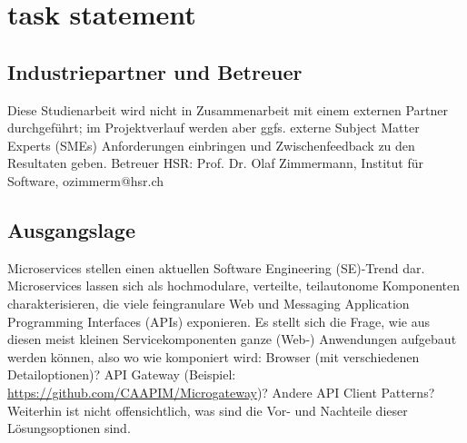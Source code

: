  
\section{task statement}

\subsection{Industriepartner und Betreuer}
Diese Studienarbeit wird nicht in Zusammenarbeit mit einem externen Partner durchgeführt; im Projektverlauf werden aber ggfs. externe Subject Matter Experts (SMEs) Anforderungen einbringen und Zwischenfeedback zu den Resultaten geben.   
Betreuer HSR: 
Prof. Dr. Olaf Zimmermann, Institut für Software, ozimmerm@hsr.ch  
\subsection{Ausgangslage}
Microservices stellen einen aktuellen Software Engineering (SE)-Trend dar. Microservices lassen sich als hochmodulare, verteilte, teilautonome Komponenten charakterisieren, die viele feingranulare Web und Messaging Application Programming Interfaces (APIs)  exponieren. 
Es stellt sich die Frage, wie aus diesen meist kleinen Servicekomponenten ganze (Web-) Anwendungen aufgebaut werden können, also wo wie komponiert wird: 
Browser (mit verschiedenen Detailoptionen)? 
API Gateway (Beispiel: \url{https://github.com/CAAPIM/Microgateway})? 
Andere API Client Patterns?
Weiterhin ist nicht offensichtlich, was sind die Vor- und Nachteile dieser Lösungsoptionen sind.
